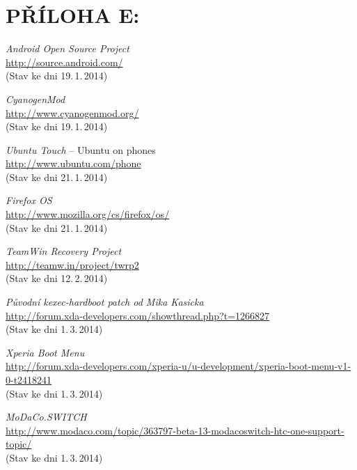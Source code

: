 \documentclass[12pt, a4paper, oneside]{article}
\newcommand{\It}{\textit}  %
\begin{document}
 \section*{PŘÍLOHA E:}
 \begin{thebibliography}{99}

     \It{Android Open Source Project} \\
    \url{http://source.android.com/}\\
    (Stav ke dni 19.\,1.\,2014)

     \It{CyanogenMod} \\
    \url{http://www.cyanogenmod.org/}\\
    (Stav ke dni 19.\,1.\,2014)

     \It{Ubuntu Touch} -- Ubuntu on phones \\
    \url{http://www.ubuntu.com/phone}\\
    (Stav ke dni 21.\,1.\,2014)

     \It{Firefox OS}\\
    \url{http://www.mozilla.org/cs/firefox/os/}\\
    (Stav ke dni 21.\,1.\,2014)

     \It{TeamWin Recovery Project}\\
    \url{http://teamw.in/project/twrp2}\\
    (Stav ke dni 12.\,2.\,2014)

     \It{Původní kexec-hardboot patch od Mika Kasicka}\\
    \url{http://forum.xda-developers.com/showthread.php?t=1266827}\\
    (Stav ke dni 1.\,3.\,2014)

     \It{Xperia Boot Menu}\\
    \url{http://forum.xda-developers.com/xperia-u/u-development/xperia-boot-menu-v1-0-t2418241}\\
    (Stav ke dni 1.\,3.\,2014)

     \It{MoDaCo.SWITCH}\\
    \url{http://www.modaco.com/topic/363797-beta-13-modacoswitch-htc-one-support-topic/}\\
    (Stav ke dni 1.\,3.\,2014)


\end{thebibliography}
\end{document}
